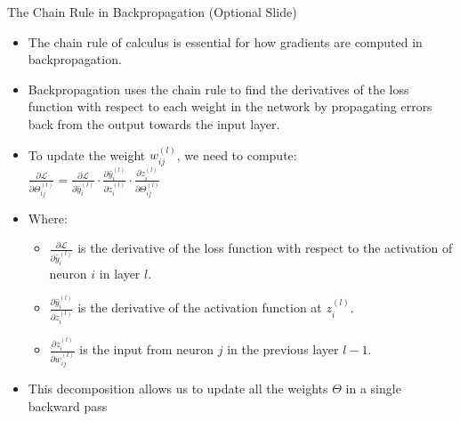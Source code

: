 \documentclass[aspectratio=169]{../latex_main/tntbeamer}  %
\begin{document}
        \begin{frame}{The Chain Rule in Backpropagation (Optional Slide)}

        \vspace{-2em}
        \begin{itemize}
            \item The chain rule of calculus is essential for how gradients are computed in backpropagation.
            \item Backpropagation uses the chain rule to find the derivatives of the loss function with respect to each weight in the network by propagating errors back from the output towards the input layer.
        \end{itemize}
        
        \begin{itemize}
            \item To update the weight \( w_{ij}^{(l)} \), we need to compute:\\
            $
            \frac{\partial \mathcal{L}}{\partial \Theta_{ij}^{(l)}} = \frac{\partial \mathcal{L}}{\partial \hat{y}_i^{(l)}} \cdot \frac{\partial \hat{y}_i^{(l)}}{\partial z_i^{(l)}} \cdot \frac{\partial z_i^{(l)}}{\partial \Theta_{ij}^{(l)}}
            $
            \item Where:
            \begin{itemize}
                \item \( \frac{\partial \mathcal{L}}{\partial \hat{y}_i^{(l)}} \) is the derivative of the loss function with respect to the activation of neuron \( i \) in layer \( l \).
                \item \( \frac{\partial \hat{y}_i^{(l)}}{\partial z_i^{(l)}} \) is the derivative of the activation function at \( z_i^{(l)} \).
                \item \( \frac{\partial z_i^{(l)}}{\partial w_{ij}^{(l)}} \) is the input from neuron \( j \) in the previous layer \( l-1 \).
            \end{itemize}
            \item This decomposition allows us to update all the weights $\Theta$ in a single backward pass
        \end{itemize}

        \end{frame}

 	
\end{document}
